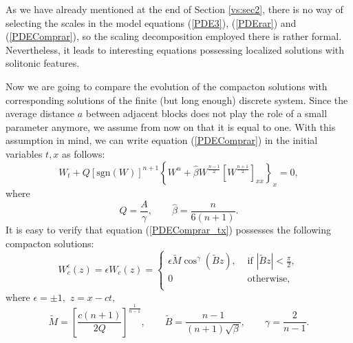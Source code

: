 \documentclass[12pt]{article}
\begin{document}
As we have already mentioned at the end of Section \ref{vs:sec2}, there is no way of selecting the scales in the model equations (\ref{PDE3}),   (\ref{PDErar}) and (\ref{PDEComprar}), so the  scaling decomposition employed there is rather formal. Nevertheless, it leads to  interesting equations possessing localized solutions with solitonic features.

Now we are going to compare the evolution of the compacton solutions with {corresponding} solutions of the finite (but long enough) discrete system.
Since the average distance $a$ between adjacent blocks does not play the role of a small parameter anymore, we assume from now on that it is equal to one.
With this assumption in mind, we can write equation (\ref{PDEComprar}) in the initial variables $t, x$ as follows:
\begin{equation}\label{PDEComprar_tx}
W_{ t}+Q\left[\mathrm{sgn}(W)\right]^{n+1} \left\{W^n+ \hat\beta W^\frac{n-1}{2} \left[W^\frac{n+1}{2}  \right]_{xx}  \right\}_{x}=0,
\end{equation}
where
\[
Q=\frac{A}{\gamma}, \qquad \hat\beta=\frac{n}{6 (n+1)}.
\]
It is easy to verify that equation (\ref{PDEComprar_tx}) possesses the following compacton solutions:
\begin{equation}\label{comp2atx}
W_c^\epsilon(z)=\epsilon W_c(z)=\begin{cases}\epsilon  \tilde M \cos^{\gamma}{\left(\tilde B z\right)}, & \mbox{   if   }  |\tilde B z|<\frac{\pi}{2}, \\
0   & \mbox{  otherwise},\\
\end{cases}
\end{equation}
where $\epsilon = \pm 1,$  $z=x-c t,$
\[
 \tilde M=\left[\frac{c (n+1)}{2 Q}  \right]^{\frac{1}{n-1}}, \qquad \tilde B=\frac{n-1}{(n+1) \sqrt{\beta}},  \qquad \gamma=\frac{2}{n-1}.
\]
\end{document}
